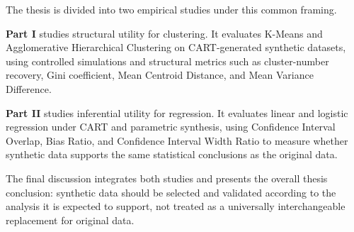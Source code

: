 The thesis is divided into two empirical studies under this common framing.

\textbf{Part I} studies structural utility for clustering. It evaluates K-Means and Agglomerative Hierarchical Clustering on CART-generated synthetic datasets, using controlled simulations and structural metrics such as cluster-number recovery, Gini coefficient, Mean Centroid Distance, and Mean Variance Difference.

\textbf{Part II} studies inferential utility for regression. It evaluates linear and logistic regression under CART and parametric synthesis, using Confidence Interval Overlap, Bias Ratio, and Confidence Interval Width Ratio to measure whether synthetic data supports the same statistical conclusions as the original data.

The final discussion integrates both studies and presents the overall thesis conclusion: synthetic data should be selected and validated according to the analysis it is expected to support, not treated as a universally interchangeable replacement for original data.
